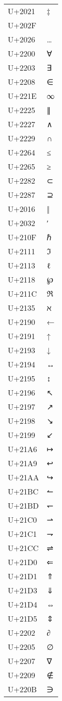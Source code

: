 \documentclass{article}
\begin{document}
\begin{longtable}{ll}
U+2021 & ‡ \\
U+202F &   \\
U+2026 & … \\
U+2200 & ∀ \\
U+2203 & ∃ \\
U+2208 & ∈ \\
U+221E & ∞ \\
U+2225 & ∥ \\
U+2227 & ∧ \\
U+2229 & ∩ \\
U+2264 & ≤ \\
U+2265 & ≥ \\
U+2282 & ⊂ \\
U+2287 & ⊇ \\
U+2016 & ‖ \\
U+2032 & ′ \\
U+210F & ℏ \\
U+2111 & ℑ \\
U+2113 & ℓ \\
U+2118 & ℘ \\
U+211C & ℜ \\
U+2135 & ℵ \\
U+2190 & ← \\
U+2191 & ↑ \\
U+2193 & ↓ \\
U+2194 & ↔ \\
U+2195 & ↕ \\
U+2196 & ↖ \\
U+2197 & ↗ \\
U+2198 & ↘ \\
U+2199 & ↙ \\
U+21A6 & ↦ \\
U+21A9 & ↩ \\
U+21AA & ↪ \\
U+21BC & ↼ \\
U+21BD & ↽ \\
U+21C0 & ⇀ \\
U+21C1 & ⇁ \\
U+21CC & ⇌ \\
U+21D0 & ⇐ \\
U+21D1 & ⇑ \\
U+21D3 & ⇓ \\
U+21D4 & ⇔ \\
U+21D5 & ⇕ \\
U+2202 & ∂ \\
U+2205 & ∅ \\
U+2207 & ∇ \\
U+2209 & ∉ \\
U+220B & ∋ \\

\end{longtable}
\end{document}
